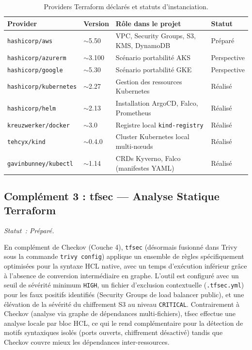 \begin{table}[htbp]
\centering
\scriptsize
\begin{tabular}{@{}p{3cm}p{2.5cm}p{5.5cm}p{2cm}@{}}
\toprule
\textbf{Provider} & \textbf{Version} & \textbf{Rôle dans le projet} & \textbf{Statut} \\
\midrule
\texttt{hashicorp/aws} & $\sim$5.50 & VPC, Security Groups, S3, KMS, DynamoDB & Préparé \\
\texttt{hashicorp/azurerm} & $\sim$3.100 & Scénario portabilité AKS & Perspective \\
\texttt{hashicorp/google} & $\sim$5.30 & Scénario portabilité GKE & Perspective \\
\texttt{hashicorp/kubernetes} & $\sim$2.27 & Gestion des ressources Kubernetes & Réalisé \\
\texttt{hashicorp/helm} & $\sim$2.13 & Installation ArgoCD, Falco, Prometheus & Réalisé \\
\texttt{kreuzwerker/docker} & $\sim$3.0 & Registre local \texttt{kind-registry} & Réalisé \\
\texttt{tehcyx/kind} & $\sim$0.4.0 & Cluster Kubernetes local multi-nœuds & Réalisé \\
\texttt{gavinbunney/kubectl} & $\sim$1.14 & CRDs Kyverno, Falco (manifestes YAML) & Réalisé \\
\bottomrule
\end{tabular}
\caption{Providers Terraform déclarés et statuts d'instanciation.}
\label{tab:terraform_providers}
\end{table}


\subsection{Complément 3 : tfsec — Analyse Statique Terraform}
\label{subsec:comp_tfsec}
\textit{Statut~: Préparé.}

En complément de Checkov (Couche 4), \texttt{tfsec} (désormais fusionné dans Trivy sous la commande \texttt{trivy config}) applique un ensemble de règles spécifiquement optimisées pour la syntaxe HCL native, avec un temps d'exécution inférieur grâce à l'absence de conversion intermédiaire en graphe. L'outil est configuré avec un seuil de sévérité minimum \texttt{HIGH}, un fichier d'exclusion contextuelle (\texttt{.tfsec.yml}) pour les faux positifs identifiés (Security Groups de load balancer public), et une élévation de la sévérité du chiffrement S3 au niveau \texttt{CRITICAL}. Contrairement à Checkov (analyse via graphe de dépendances multi-fichiers), tfsec effectue une analyse locale par bloc HCL, ce qui le rend complémentaire pour la détection de motifs syntaxiques isolés (ports ouverts, chiffrement désactivé) tandis que Checkov couvre mieux les dépendances inter-ressources.


